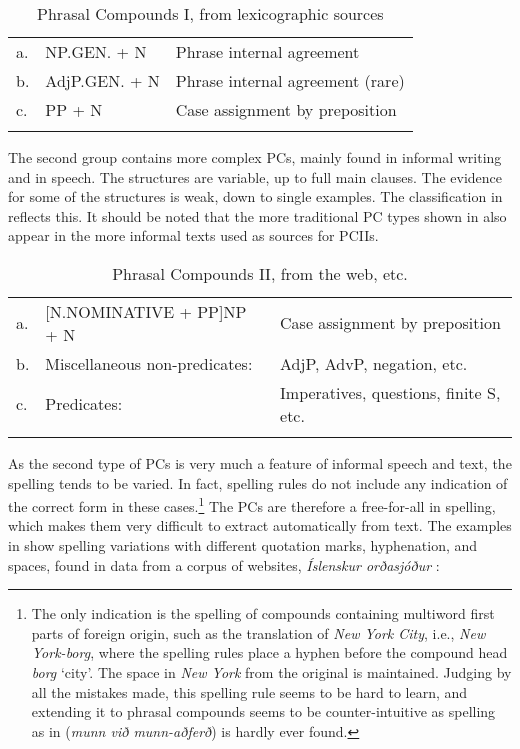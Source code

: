 \documentclass[output=paper]{LSP/langsci}
\begin{document}
\begin{xlist}
\begin{table}
  \caption{Phrasal Compounds I, from lexicographic sources}
  \label{tab:bjarnadottir:5}
\begin{tabular}{lll}
\lsptoprule
  a. &NP.GEN. + N 	&Phrase internal agreement \\
  b. &AdjP.GEN. + N 	&Phrase internal agreement (rare)\\
  c. &PP + N 		&Case assignment by preposition\\
\lspbottomrule
  \end{tabular}
\end{table}

The second group contains more complex PCs, mainly found in informal writing and in speech. The structures are variable, up to full main clauses. The evidence for some of the structures is weak, down to single examples. The classification in  reflects this. It should be noted that the more traditional PC types shown in  also appear in the more informal texts used as sources for PCIIs.

\begin{table}\caption{Phrasal Compounds II, from the web, etc.\label{tab:bjarnadottir:6}}
\begin{tabular}{lll}\lsptoprule 
  a. &[N.NOMINATIVE + PP]NP + N 		&Case assignment by preposition\\
  b. &Miscellaneous non-predicates:  &AdjP, AdvP, negation, etc. \\
  c. &Predicates: 					&Imperatives, questions, finite S, etc.\\\lspbottomrule
\end{tabular}
\end{table}

As the second type of PCs is very much a feature of informal speech and text, the spelling tends to be varied. In fact,  spelling rules do not include any indication of the correct form in these cases.\footnote{The only indication is the spelling of compounds containing multiword first parts of foreign origin, such as the translation of \textit{New York City}, i.e., \textit{New York-borg}, where the spelling rules place a hyphen before the compound head \textit{borg} `city'. The space in \textit{New York} from the  original is maintained. Judging by all the mistakes made, this spelling rule seems to be hard to learn, and extending it to phrasal compounds seems to be counter-intuitive as spelling as in  (\textit{munn við munn-aðferð}) is hardly ever found.} The PCs are therefore a free-for-all in  spelling, which makes them very difficult to extract automatically from text. The examples in  show spelling variations with different quotation marks, hyphenation, and spaces, found in data from a corpus of  websites, \textit{Íslenskur orðasjóður} \citep{HallsteinsdóttirEtAl2007}:



\end{xlist}
\end{document}
